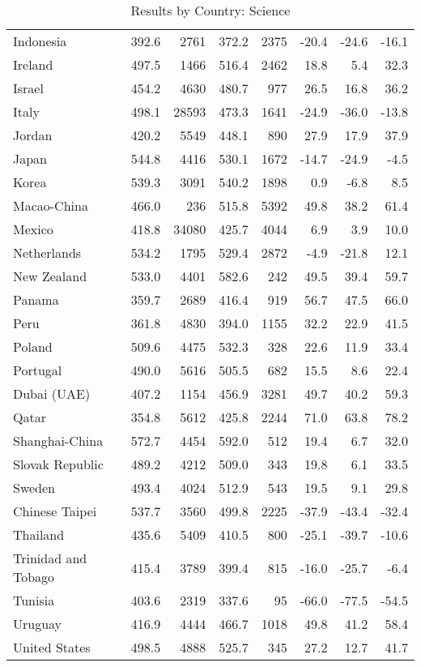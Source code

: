 \begin{table}[ht]
\begin{center}
{\begin{tabular}{lrr@{\extracolsep{10pt}}rr@{\extracolsep{10pt}}rrr}
  Indonesia & 392.6 & 2761 & 372.2 & 2375 & -20.4 & -24.6 & -16.1 \\ 
  Ireland & 497.5 & 1466 & 516.4 & 2462 & 18.8 & 5.4 & 32.3 \\ 
  Israel & 454.2 & 4630 & 480.7 & 977 & 26.5 & 16.8 & 36.2 \\ 
  Italy & 498.1 & 28593 & 473.3 & 1641 & -24.9 & -36.0 & -13.8 \\ 
  Jordan & 420.2 & 5549 & 448.1 & 890 & 27.9 & 17.9 & 37.9 \\ 
  Japan & 544.8 & 4416 & 530.1 & 1672 & -14.7 & -24.9 & -4.5 \\ 
  Korea & 539.3 & 3091 & 540.2 & 1898 & 0.9 & -6.8 & 8.5 \\ 
  Macao-China & 466.0 & 236 & 515.8 & 5392 & 49.8 & 38.2 & 61.4 \\ 
  Mexico & 418.8 & 34080 & 425.7 & 4044 & 6.9 & 3.9 & 10.0 \\ 
  Netherlands & 534.2 & 1795 & 529.4 & 2872 & -4.9 & -21.8 & 12.1 \\ 
  New Zealand & 533.0 & 4401 & 582.6 & 242 & 49.5 & 39.4 & 59.7 \\ 
  Panama & 359.7 & 2689 & 416.4 & 919 & 56.7 & 47.5 & 66.0 \\ 
  Peru & 361.8 & 4830 & 394.0 & 1155 & 32.2 & 22.9 & 41.5 \\ 
  Poland & 509.6 & 4475 & 532.3 & 328 & 22.6 & 11.9 & 33.4 \\ 
  Portugal & 490.0 & 5616 & 505.5 & 682 & 15.5 & 8.6 & 22.4 \\ 
  Dubai (UAE) & 407.2 & 1154 & 456.9 & 3281 & 49.7 & 40.2 & 59.3 \\ 
  Qatar & 354.8 & 5612 & 425.8 & 2244 & 71.0 & 63.8 & 78.2 \\ 
  Shanghai-China & 572.7 & 4454 & 592.0 & 512 & 19.4 & 6.7 & 32.0 \\ 
  Slovak Republic & 489.2 & 4212 & 509.0 & 343 & 19.8 & 6.1 & 33.5 \\ 
  Sweden & 493.4 & 4024 & 512.9 & 543 & 19.5 & 9.1 & 29.8 \\ 
  Chinese Taipei & 537.7 & 3560 & 499.8 & 2225 & -37.9 & -43.4 & -32.4 \\ 
  Thailand & 435.6 & 5409 & 410.5 & 800 & -25.1 & -39.7 & -10.6 \\ 
  Trinidad and Tobago & 415.4 & 3789 & 399.4 & 815 & -16.0 & -25.7 & -6.4 \\ 
  Tunisia & 403.6 & 2319 & 337.6 & 95 & -66.0 & -77.5 & -54.5 \\ 
  Uruguay & 416.9 & 4444 & 466.7 & 1018 & 49.8 & 41.2 & 58.4 \\ 
  United States & 498.5 & 4888 & 525.7 & 345 & 27.2 & 12.7 & 41.7 \\ 
   \hline
\end{tabular}
}
\caption{Results by Country: Science}
\label{level2scie}
\end{center}
\end{table}
